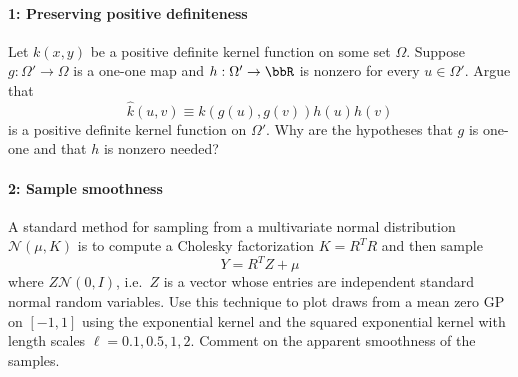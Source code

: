 \documentclass[12pt, leqno]{article} %
\begin{document}

\paragraph*{1: Preserving positive definiteness}
Let $k(x,y)$ be a positive definite kernel function on some set
$\Omega$.  Suppose $g : \Omega' \rightarrow \Omega$ is a one-one
map and $h : \Omega' \rightarrow \bbR$ is nonzero for every $u \in \Omega'$.
Argue that
\[
  \hat{k}(u,v) \equiv k(g(u), g(v)) h(u) h(v)
\]
is a positive definite kernel function on $\Omega'$.  Why are the
hypotheses that $g$ is one-one and that $h$ is nonzero needed?

\paragraph*{2: Sample smoothness}
A standard method for sampling from a multivariate normal distribution
$\mathcal{N}(\mu, K)$ is to compute a Cholesky factorization
$K = R^T R$ and then sample
\[
  Y = R^T Z + \mu
\]
where $Z \mathcal{N}(0, I)$, i.e.~$Z$ is a vector whose entries are
independent standard normal random variables.  Use this technique to
plot draws from a mean zero GP on $[-1,1]$ using the exponential
kernel and the squared exponential kernel with length scales
$\ell = 0.1, 0.5, 1, 2$.  Comment on the apparent smoothness of the samples.
\end{document}
